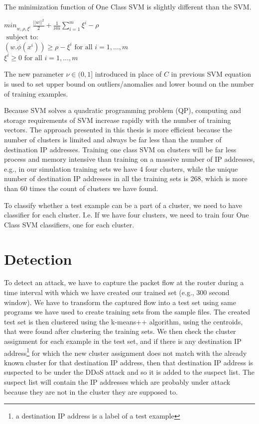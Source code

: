 \documentclass[12pt,oneside,a4paper]{article}
\begin{document}
The minimization function of One Class SVM is slightly different than the SVM. \cite{svm}

\begin{center}
  ${min}_{w,\rho,\xi^i} \ \frac{||w||^2}{2} + \frac{1}{\nu m} \sum_{i=1}^m \xi^i - \rho$ \\
  $\mbox{ subject to: }$ \\
  $(w.\phi(x^i)) \geq \rho - \xi^i \mbox{ for all } i = 1, \dots, m$ \\
  \hspace{2cm} $\xi^i \geq 0 \mbox{ for all } i = 1, \dots, m$ \\
\end{center}

The new parameter $\nu \in (0,1]$ introduced in place of $C$ in previous SVM equation is used to set upper bound on outliers/anomalies and lower bound on the number of training examples.

Because SVM solves a quadratic programming problem (QP), computing and storage requirements of SVM increase rapidly with the number of training vectors. The approach presented in this thesis is more efficient because the number of clusters is limited and always be far less than the number of destination IP addresses. Training one class SVM on clusters will be far less process and memory intensive than training on a massive number of IP addresses, e.g., in our simulation training sets we have 4 four clusters, while the unique number of destination IP addresses in all the training sets is 268, which is more than 60 times the count of clusters we have found.

To classify whether a test example can be a part of a cluster, we need to have classifier for each cluster. I.e. If we have four clusters, we need to train four One Class SVM classifiers, one for each cluster.
\pagebreak
\section{Detection} \label{sec:Detection}

To detect an attack, we have to capture the packet flow at the router during a time interval with which we have created our trained set (e.g., 300 second window). We have to transform the captured flow into a test set using same programs we have used to create training sets from the sample files. The created test set is then clustered using the k-means++ algorithm, using the centroids, that were found after clustering the training sets. We then check the cluster assignment for each example in the test set, and if there is any destination IP address\footnote{a destination IP address is a label of a test example} for which the new cluster assignment does not match with the already known cluster for that destination IP address, then that destination IP address is suspected to be under the DDoS attack and so it is added to the suspect list. The suspect list will contain the IP addresses which are probably under attack because they are not in the cluster they are supposed to.
\end{document}
